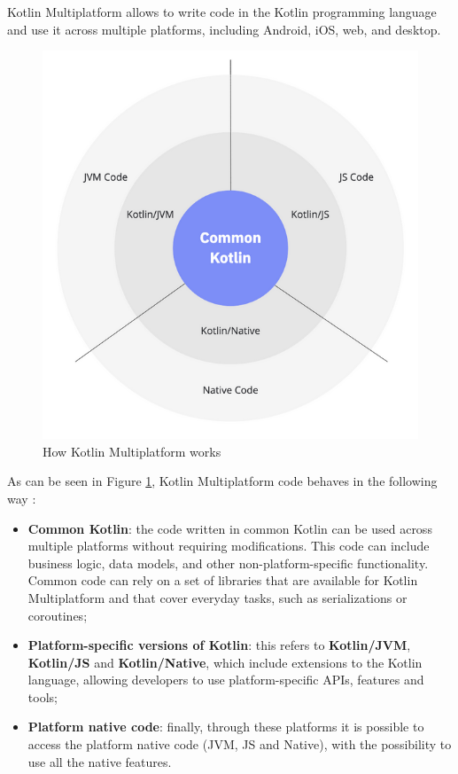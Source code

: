 Kotlin Multiplatform allows to write code in the Kotlin programming language and use it across multiple platforms, including Android, iOS, web, and desktop.
\begin{figure}[!ht]
    \centering
    \includegraphics[scale=0.9]{document/chapters/4-collektive/images/kotlin_multiplatform_code.png}
    \caption{How Kotlin Multiplatform works \cite{kotlin_multiplatform_overview}}
    \label{fig:km_code_work}
\end{figure}
As can be seen in Figure \ref{fig:km_code_work}, Kotlin Multiplatform code behaves in the following way \cite{kotlin_multiplatform_overview}:
\begin{itemize}
    \item \textbf{Common Kotlin}: the code written in common Kotlin can be used across multiple platforms without requiring modifications. This code can include business logic, data models, and other non-platform-specific functionality. Common code can rely on a set of libraries that are available for Kotlin Multiplatform and that cover everyday tasks, such as serializations or coroutines;
    \item \textbf{Platform-specific versions of Kotlin}: this refers to \textbf{Kotlin/JVM}, \textbf{Kotlin/JS} and \textbf{Kotlin/Native}, which include extensions to the Kotlin language, allowing developers to use platform-specific APIs, features and tools;
    \item \textbf{Platform native code}: finally, through these platforms it is possible to access the platform native code (JVM, JS and Native), with the possibility to use all the native features.
\end{itemize}

